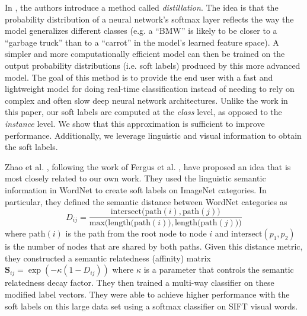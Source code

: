 In \cite{hinton2015distilling}, the authors introduce a method called
\emph{distillation}. The idea is that the probability distribution of a neural
network's softmax layer reflects the way the model generalizes different classes
(e.g. a ``BMW'' is likely to be closer to a ``garbage truck'' than to a
``carrot'' in the model's learned feature space). A simpler and more
computationally efficient model can then be trained on the output probability
distributions (i.e. soft labels) produced by this more advanced model. The goal
of this method is to provide the end user with a fast and lightweight model for
doing real-time classification instead of needing to rely on complex and often
slow deep neural network architectures. Unlike the work in this paper, our soft
labels are computed at the \emph{class} level, as opposed to the \emph{instance}
level. We show that this approximation is sufficient to improve performance.
Additionally, we leverage linguistic and visual information to obtain the soft
labels.


Zhao et al. \cite{zhao2011large}, following the work of Fergus et al.
\cite{fergus2010semantic}, have proposed an idea that is most closely related
to our own work.
They used the linguistic semantic information in WordNet to create soft labels
on ImageNet categories. In particular, they defined the semantic distance
between WordNet categories as
\begin{equation}
\label{eq:wordnet_dist}
D_{ij} = \frac{\mathrm{intersect(path}(i), \mathrm{path}(j))}{\mathrm{max(length(path}(i)), \mathrm{length(path}(j)))}
\end{equation}
where $\mathrm{path}(i)$ is the path from the root node to node $i$ and
$\mathrm{intersect}(p_1, p_2)$ is the number of nodes that are shared by both
paths. Given this distance metric, they constructed a semantic relatedness
(affinity) matrix $\mathbf{S}_{ij} = \exp(-\kappa(1-D_{ij}))$ where $\kappa$ is
a parameter that controls the semantic relatedness decay factor. They then
trained a multi-way classifier on these modified label vectors. They were able
to achieve higher performance with the soft labels on this large data set using
a softmax classifier on SIFT visual words.


